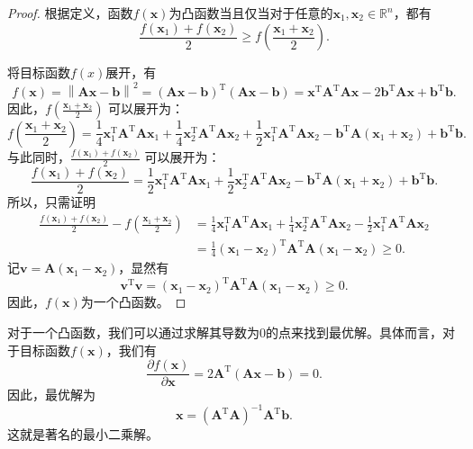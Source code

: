 \begin{proof}
    根据定义，函数\( f(\bm{x}) \)为凸函数当且仅当对于任意的\( \bm{x}_1, \bm{x}_2 \in \mathbb{R}^n \)，都有
    \[
        \frac{f(\bm{x}_1) + f(\bm{x}_2)}{2} \geq f\left(\frac{\bm{x}_1 + \bm{x}_2}{2}\right).
    \]

    将目标函数\( f(x) \)展开，有
    \[
        f(\bm{x}) = \left\| \mathbf{A} \bm{x} - \bm{b} \right\|^2 = (\mathbf{A} \bm{x} - \bm{b})^{\mathrm{T}} (\mathbf{A} \bm{x} - \bm{b}) = \bm{x}^{\mathrm{T}} \mathbf{A}^{\mathrm{T}} \mathbf{A} \bm{x} - 2 \bm{b}^{\mathrm{T}} \mathbf{A} \bm{x} + \bm{b}^{\mathrm{T}} \bm{b}.
    \]
    因此，\( f\left(\frac{\bm{x}_1 + \bm{x}_2}{2}\right) \) 可以展开为：
    \[
        f\left(\frac{\bm{x}_1 + \bm{x}_2}{2}\right) = \frac{1}{4} \bm{x}_1^{\mathrm{T}} \mathbf{A}^{\mathrm{T}} \mathbf{A} \bm{x}_1 + \frac{1}{4} \bm{x}_2^{\mathrm{T}} \mathbf{A}^{\mathrm{T}} \mathbf{A} \bm{x}_2 + \frac{1}{2} \bm{x}_1^{\mathrm{T}} \mathbf{A}^{\mathrm{T}} \mathbf{A} \bm{x}_2 - \bm{b}^{\mathrm{T}} \mathbf{A} (\bm{x}_1 + \bm{x}_2) + \bm{b}^{\mathrm{T}} \bm{b}.
    \]
    与此同时，\( \frac{f(\bm{x}_1) + f(\bm{x}_2)}{2} \) 可以展开为：
    \[
        \frac{f(\bm{x}_1) + f(\bm{x}_2)}{2} = \frac{1}{2} \bm{x}_1^{\mathrm{T}} \mathbf{A}^{\mathrm{T}} \mathbf{A} \bm{x}_1 + \frac{1}{2} \bm{x}_2^{\mathrm{T}} \mathbf{A}^{\mathrm{T}} \mathbf{A} \bm{x}_2 - \bm{b}^{\mathrm{T}} \mathbf{A} (\bm{x}_1 + \bm{x}_2) + \bm{b}^{\mathrm{T}} \bm{b}.
    \]
    所以，只需证明
    \[
        \begin{split}
            \frac{f(\bm{x}_1) + f(\bm{x}_2)}{2} - f\left(\frac{\bm{x}_1 + \bm{x}_2}{2}\right) & = \frac{1}{4} \bm{x}_1^{\mathrm{T}} \mathbf{A}^{\mathrm{T}} \mathbf{A} \bm{x}_1 + \frac{1}{4} \bm{x}_2^{\mathrm{T}} \mathbf{A}^{\mathrm{T}} \mathbf{A} \bm{x}_2 - \frac{1}{2} \bm{x}_1^{\mathrm{T}} \mathbf{A}^{\mathrm{T}} \mathbf{A} \bm{x}_2 \\
                                                                                              & = \frac{1}{4} (\bm{x}_1 - \bm{x}_2)^{\mathrm{T}} \mathbf{A}^{\mathrm{T}} \mathbf{A} (\bm{x}_1 - \bm{x}_2) \geq 0.
        \end{split}
    \]
    记\( \bm{v} = \mathbf{A} (\bm{x}_1 - \bm{x}_2) \)，显然有
    \[
        \bm{v}^{\mathrm{T}} \bm{v} = (\bm{x}_1 - \bm{x}_2)^{\mathrm{T}} \mathbf{A}^{\mathrm{T}} \mathbf{A} (\bm{x}_1 - \bm{x}_2) \geq 0.
    \]
    因此，\( f(\bm{x}) \)为一个凸函数。
\end{proof}

对于一个凸函数，我们可以通过求解其导数为0的点来找到最优解。具体而言，对于目标函数\( f(\bm{x}) \)，我们有
\[
    \frac{\partial f(\bm{x})}{\partial \bm{x}} = 2 \mathbf{A}^{\mathrm{T}} (\mathbf{A} \bm{x} - \bm{b}) = 0.
\]
因此，最优解为
\[
    \bm{x} = \left( \mathbf{A}^{\mathrm{T}} \mathbf{A} \right)^{-1} \mathbf{A}^{\mathrm{T}} \bm{b}.
\]
这就是著名的最小二乘解。

